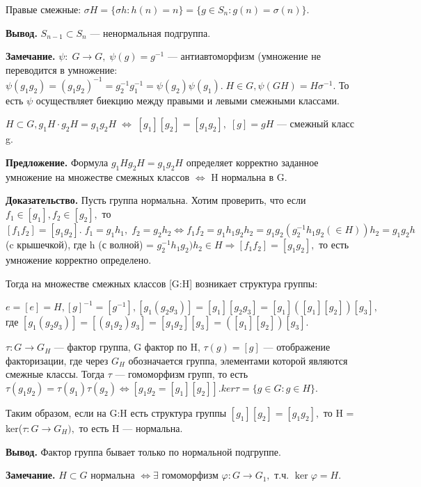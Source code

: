 \documentclass[12pt,a4paper]{article}
\begin{document}
Правые смежные: $\sigma H = \{\sigma h: h(n) = n\} = \{g \in S_{n}: g(n) = \sigma(n)\}.$

\textbf{Вывод.} $S_{n - 1} \subset S_{n}$ --- ненормальная подгруппа. 

\textbf{Замечание.} $\psi: \; G \to G, \; \psi(g) = g^{-1}$ --- антиавтоморфизм (умножение не переводится в умножение: $\psi(g_{1}g_{2}) = (g_{1}g_{2})^{-1} = g_{2}^{-1}g_{1}^{-1} = \psi(g_{2})\psi(g_{1}). \; H \in G, \psi(GH) = H\sigma^{-1}.$ То есть $\psi$ осуществляет биекцию между правыми и левыми смежными классами. 

$H \subset G, g_{1}H\cdot g_{2}H = g_{1}g_{2}H \; \Leftrightarrow \; [g_{1}][g_{2}] = [g_{1}g_{2}], \; [g] = gH$ --- смежный класс g.  

\textbf{Предложение.} Формула $g_{1}Hg_{2}H = g_{1}g_{2}H$ определяет корректно заданное умножение на множестве смежных классов $\Leftrightarrow$ H нормальна в G. 

\textbf{Доказательство.} Пусть группа нормальна. Хотим проверить, что если $f_{1} \in [g_{1}], f_{2} \in [g_{2}],$ то $[f_{1}f_{2}] = [g_{1}g_{2}]. \; f_{1} = g_{1}h_{1}, \; f_{2} = g_{2}h_{2} \Leftrightarrow f_{1}f_{2} = g_{1}h_{1}g_{2}h_{2} = g_{1}g_{2}(g_{2}^{-1}h_{1}g_{2} (\in H)) h_{2} = g_{1}g_{2} h$(c крышечкой),  где h (с волной) = $g_{2}^{-1}h_{1}g_{2})h_{2} \in H \Rightarrow [f_{1}f_{2}] = [g_{1}g_{2}],$ то есть умножение корректно определено. 

Тогда на множестве смежных классов [G:H] возникает структура группы: 

$e = [e] = H, [g]^{-1} = [g^{-1}], [g_{1}(g_{2}g_{3})] = [g_{1}][g_{2}g_{3}] = [g_{1}]([g_{1}][g_{2}])[g_{3}],$ где $[g_{1}(g_{2}g_{3})] = [(g_{1}g_{2})g_{3}] = [g_{1}g_{2}][g_{3}] = ([g_{1}][g_{2}])[g_{3}].$

$\tau: G \to G_{H}$ --- фактор группа, G фактор по H, $\tau(g) = [g]$ --- отображение факторизации, где  через $G_{H}$ обозначается группа, элементами которой являются смежные классы. Тогда $\tau$ --- гомоморфизм групп, то есть $\tau(g_{1}g_{2}) = \tau(g_{1})\tau(g_{2}) \Leftrightarrow [g_{1}g_{2} = [g_{1}][g_{2}]]. ker \tau = \{g \in G: g \in H\}.$

Таким образом, если на G:H есть структура группы $[g_{1}][g_{2}] = [g_{1}g_{2}],$ то H = ker($\tau: G \to G_{H}),$ то есть H --- нормальна. 

\textbf{Вывод.} Фактор группа бывает только по нормальной подгруппе. 

\textbf{Замечание.} $H \subset G$ нормальна $\Leftrightarrow \exists$ гомоморфизм $\varphi: G \to G_{1},$ т.ч. $\ker \varphi = H.$ 
\end{document}
